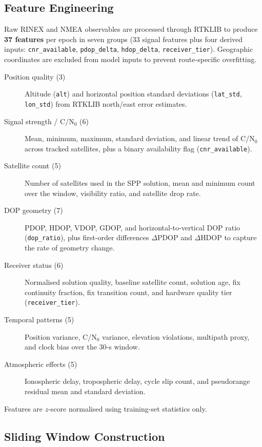 \documentclass[12pt,a4paper]{article}
\begin{document}
\subsection{Feature Engineering}

Raw RINEX and NMEA observables are processed through RTKLIB \cite{rtklib} to produce
\textbf{37 features} per epoch in seven groups (33 signal features plus four derived
inputs: \texttt{cnr\_available}, \texttt{pdop\_delta}, \texttt{hdop\_delta},
\texttt{receiver\_tier}). Geographic coordinates are excluded from model inputs to
prevent route-specific overfitting.

\begin{description}
  \item[Position quality (3)] Altitude (\texttt{alt}) and horizontal position standard deviations (\texttt{lat\_std}, \texttt{lon\_std}) from RTKLIB north/east error estimates.
  \item[Signal strength / C/N$_0$ (6)] Mean, minimum, maximum, standard deviation, and linear trend of C/N$_0$ across tracked satellites, plus a binary availability flag (\texttt{cnr\_available}).
  \item[Satellite count (5)] Number of satellites used in the SPP solution, mean and minimum count over the window, visibility ratio, and satellite drop rate.
  \item[DOP geometry (7)] PDOP, HDOP, VDOP, GDOP, and horizontal-to-vertical DOP ratio (\texttt{dop\_ratio}), plus first-order differences $\Delta$PDOP and $\Delta$HDOP to capture the rate of geometry change.
  \item[Receiver status (6)] Normalised solution quality, baseline satellite count, solution age, fix continuity fraction, fix transition count, and hardware quality tier (\texttt{receiver\_tier}).
  \item[Temporal patterns (5)] Position variance, C/N$_0$ variance, elevation violations, multipath proxy, and clock bias over the 30-s window.
  \item[Atmospheric effects (5)] Ionospheric delay, tropospheric delay, cycle slip count, and pseudorange residual mean and standard deviation.
\end{description}

Features are $z$-score normalised using training-set statistics only.

\subsection{Sliding Window Construction}
\end{document}

